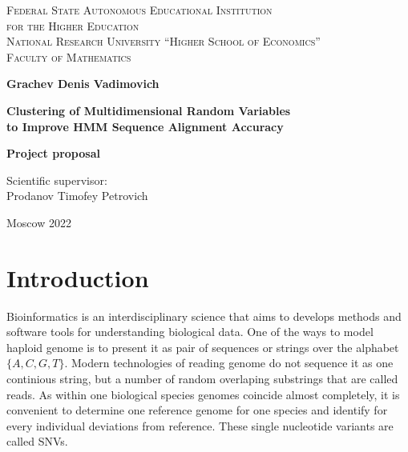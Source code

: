 \documentclass[a4paper, 12pt]{article}
\theoremstyle{definition}
\theoremstyle{definition}
\theoremstyle{remark}
\begin{document}
\begin{center}
{\scshape Federal State Autonomous Educational Institution\\
for the Higher Education\\
National Research University ``Higher School of Economics''\\[1ex]
Faculty of Mathematics\par}

\par\vfill

\textbf{\large Grachev Denis Vadimovich}

\vspace{1.5cm}

{\Large\bfseries
Clustering of Multidimensional Random Variables \\ to Improve HMM Sequence Alignment Accuracy
\par}

\vspace{1.5cm}

\textbf{\large Project proposal}

\vspace{1cm}

\par\vfill
\noindent\parbox[t]{0.48\textwidth}{%
Scientific supervisor:\\[3pt]
Prodanov Timofey Petrovich
}
\par\vfill\vfill
Moscow 2022
\end{center}
\thispagestyle{empty}
\pagebreak

\tableofcontents
\newpage

\section{Introduction}
Bioinformatics is an interdisciplinary science that aims 
to develops methods and software tools 
for understanding biological data. 
One of the ways to model haploid genome is to present it as 
pair of sequences or strings over the alphabet $\{ A, C, G, T \}$. 
Modern technologies of reading genome do not sequence it as one 
continious string, but a number of random overlaping substrings 
that are called reads. 
As within one biological species genomes coincide almost completely, 
it is convenient to determine one reference genome for one species 
and identify for every individual deviations from reference.
These single nucleotide variants are called SNVs.  
\end{document}
